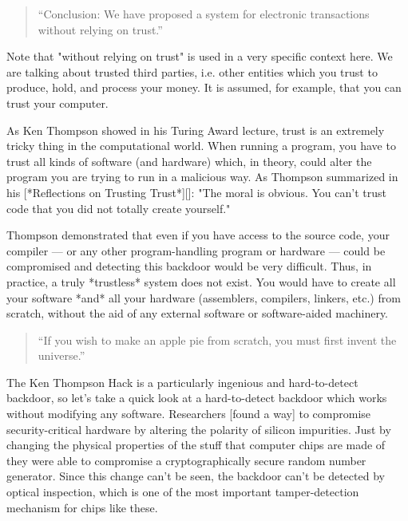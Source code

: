 \begin{quotation}
``Conclusion: We have proposed a system for electronic transactions
without relying on trust.''
\end{quotation}

Note that "without relying on trust" is used in a very specific context
here. We are talking about trusted third parties, i.e. other entities
which you trust to produce, hold, and process your money. It is assumed,
for example, that you can trust your computer.

As Ken Thompson showed in his Turing Award lecture, trust is an
extremely tricky thing in the computational world. When running a
program, you have to trust all kinds of software (and hardware) which,
in theory, could alter the program you are trying to run in a malicious
way. As Thompson summarized in his [*Reflections on Trusting Trust*][]:
"The moral is obvious. You can't trust code that you did not totally
create yourself."


Thompson demonstrated that even if you have access to the source code,
your compiler --- or any other program-handling program or
hardware --- could be compromised and detecting this backdoor would be
very difficult. Thus, in practice, a truly *trustless* system does not
exist. You would have to create all your software *and* all your
hardware (assemblers, compilers, linkers, etc.) from scratch, without
the aid of any external software or software-aided machinery.

\begin{quotation}
``If you wish to make an apple pie from scratch, you must first invent
the universe.''
\end{quotation}

The Ken Thompson Hack is a particularly ingenious and hard-to-detect
backdoor, so let's take a quick look at a hard-to-detect backdoor which
works without modifying any software. Researchers [found a way] to
compromise security-critical hardware by altering the polarity of
silicon impurities. Just by changing the physical properties of the
stuff that computer chips are made of they were able to compromise a
cryptographically secure random number generator. Since this change
can't be seen, the backdoor can't be detected by optical inspection,
which is one of the most important tamper-detection mechanism for chips
like these.

